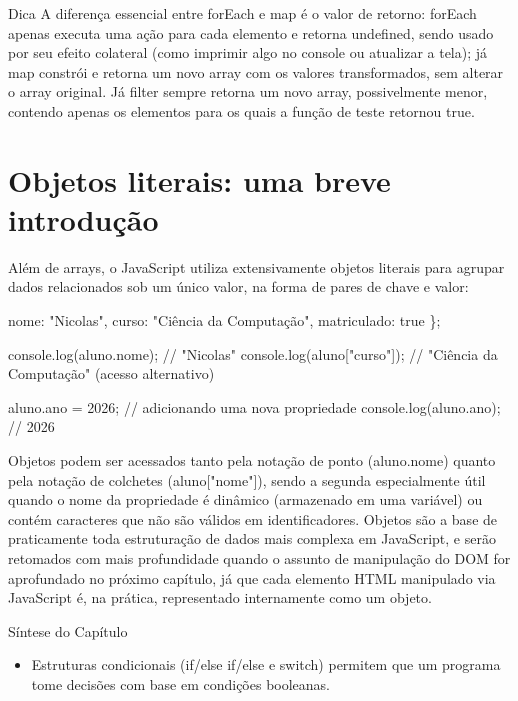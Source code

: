 \begin{infobox}{Dica}
A diferença essencial entre forEach e map é o valor de retorno: forEach apenas executa uma ação para cada elemento e retorna undefined, sendo usado por seu efeito colateral (como imprimir algo no console ou atualizar a tela); já map constrói e retorna um novo array com os valores transformados, sem alterar o array original. Já filter sempre retorna um novo array, possivelmente menor, contendo apenas os elementos para os quais a função de teste retornou true.
\end{infobox}

\section{Objetos literais: uma breve introdução}

Além de arrays, o JavaScript utiliza extensivamente objetos literais para agrupar dados relacionados sob um único valor, na forma de pares de chave e valor:

\begin{codebox}{JavaScript}
 const aluno = {
\end{codebox}

\begin{infobox}{nome: "Nicolas",}
curso: "Ciência da Computação", matriculado: true \};
\end{infobox}

console.log(aluno.nome); // "Nicolas" console.log(aluno["curso"]); // "Ciência da Computação" (acesso alternativo)

aluno.ano = 2026; // adicionando uma nova propriedade console.log(aluno.ano); // 2026

Objetos podem ser acessados tanto pela notação de ponto (aluno.nome) quanto pela notação de colchetes (aluno["nome"]), sendo a segunda especialmente útil quando o nome da propriedade é dinâmico (armazenado em uma variável) ou contém caracteres que não são válidos em identificadores. Objetos são a base de praticamente toda estruturação de dados mais complexa em JavaScript, e serão retomados com mais profundidade quando o assunto de manipulação do DOM for aprofundado no próximo capítulo, já que cada elemento HTML manipulado via JavaScript é, na prática, representado internamente como um objeto.

Síntese do Capítulo

\begin{itemize}
  \item Estruturas condicionais (if/else if/else e switch) permitem que um programa tome decisões com base em condições booleanas.
\end{itemize}

